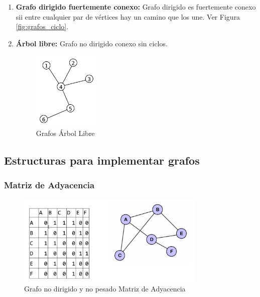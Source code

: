 \documentclass[../main.tex]{subfiles}
\begin{document}
\begin{enumerate}
        \item \textbf{Grafo dirigido fuertemente conexo:} Grafo dirigido es fuertemente conexo sii entre cualquier par de vértices hay un camino que los une. Ver Figura \ref{fig:grafos_ciclo}.
        
        \item \textbf{Árbol libre:} Grafo no dirigido conexo sin ciclos.
            \begin{figure}[ht]
                \centering
                \includegraphics[width=0.3\textwidth]{images/grafos/grafo_arbol_libre.png}
                \caption{Grafos Árbol Libre}
            \end{figure}
    \end{enumerate}
    
    \newpage

    \subsection{Estructuras para implementar grafos}

        \subsubsection{Matriz de Adyacencia}
            \begin{figure}[ht]
                \centering
                \includegraphics[width=0.8\textwidth]{images/grafos/grafo_matriz_adyacencia_1.png}
                \caption{Grafo no dirigido y no pesado Matriz de Adyacencia} 
            \end{figure}
\end{document}
